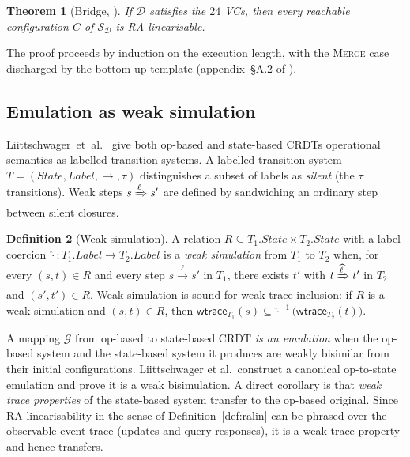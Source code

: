 \documentclass[11pt,a4paper]{article}
\newtheorem{theorem}{Theorem}[section]
\theoremstyle{definition}
\newtheorem{definition}[theorem]{Definition}
\theoremstyle{remark}
\newcommand{\RDT}{\ensuremath{\mathcal{D}}}
\newcommand{\wtrace}{\mathsf{wtrace}}
\newcommand{\Emul}{\mathcal{G}}
\begin{document}
\begin{theorem}[Bridge, \cite{sal2025}]
\label{thm:bridge}
If $\RDT$ satisfies the $24$ VCs, then every reachable configuration
$C$ of $\mathcal{S}_\RDT$ is RA-linearisable.
\end{theorem}

The proof proceeds by induction on the execution length, with the
\textsc{Merge} case discharged by the bottom-up template
(appendix~\S A.2 of \cite{sal2025}).

\subsection{Emulation as weak simulation}

Liittschwager~et~al.~\cite{liittschwager2025} give both op-based and
state-based CRDTs operational semantics as labelled transition
systems. A labelled transition system $T = (\mathit{State},
\mathit{Label}, \to, \tau)$ distinguishes a subset of labels as
\emph{silent} (the $\tau$ transitions). Weak steps $s
\xRightarrow{\ell} s'$ are defined by sandwiching an ordinary step
between silent closures.

\begin{definition}[Weak simulation]
\label{def:weaksim}
A relation $R \subseteq T_1.\mathit{State} \times T_2.\mathit{State}$
with a label-coercion $\widehat{\cdot}\colon T_1.\mathit{Label} \to
T_2.\mathit{Label}$ is a \emph{weak simulation} from $T_1$ to $T_2$
when, for every $(s, t) \in R$ and every step $s
\xrightarrow{\ell} s'$ in $T_1$, there exists $t'$ with
$t \xRightarrow{\widehat{\ell}} t'$ in $T_2$ and $(s', t') \in R$.
Weak simulation is sound for weak trace inclusion: if
$R$ is a weak simulation and $(s, t) \in R$, then
$\wtrace_{T_1}(s) \subseteq \widehat{\cdot}^{-1}\bigl(\wtrace_{T_2}(t)\bigr)$.
\end{definition}

A mapping $\Emul$ from op-based to state-based CRDT \emph{is an
emulation} when the op-based system and the state-based system it
produces are weakly bisimilar from their initial configurations.
Liittschwager et al.\ construct a canonical op-to-state emulation
and prove it is a weak bisimulation. A direct corollary is that
\emph{weak trace properties} of the state-based system transfer to
the op-based original. Since RA-linearisability in the sense of
Definition~\ref{def:ralin} can be phrased over the observable event
trace (updates and query responses), it is a weak trace property
and hence transfers.
\end{document}
